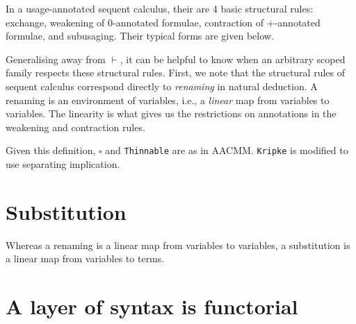 
In a usage-annotated sequent calculus, their are 4 basic structural rules:
exchange, weakening of $0$-annotated formulae, contraction of $+$-annotated
formulae, and subusaging.
Their typical forms are given below.


Generalising away from $\vdash$, it can be helpful to know when an arbitrary
scoped family respects these structural rules.
First, we note that the structural rules of sequent calculus correspond
directly to \emph{renaming} in natural deduction.
A renaming is an environment of variables, i.e., a \emph{linear} map from
variables to variables.
The linearity is what gives us the restrictions on annotations in the weakening
and contraction rules.



Given this definition, $\square$ and \texttt{Thinnable} are as in AACMM.
\texttt{Kripke} is modified to use separating implication.

\section{Substitution}

Whereas a renaming is a linear map from variables to variables, a substitution
is a linear map from variables to terms.

\section{A layer of syntax is functorial}

